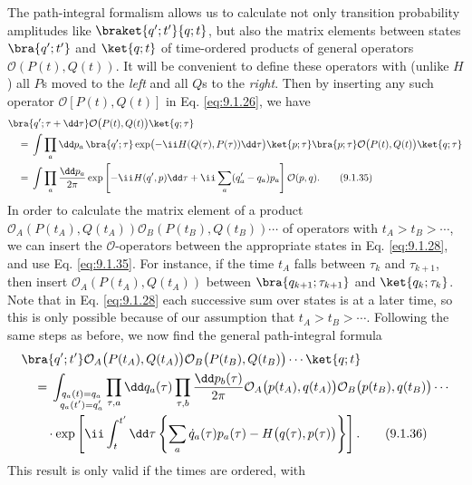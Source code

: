 The path-integral formalism allows us to calculate not only transition
probability amplitudes like $\braket{q';t'}{q;t}$, but also the matrix
elements between states $\bra{q';t'}$ and $\ket{q;t}$ of time-ordered
products of general operators $\mathcal{O}(P(t),Q(t))$. It will be convenient
to define these operators with (unlike $H$) all $P$s moved to the \emph{left}
and all $Q$s to the \emph{right}. Then by inserting any such operator
$\mathcal{O}[P(t),Q(t)]$ in Eq. \eqref{eq:9.1.26}, we have
\begin{align}
  &\bra{q';\tau+\dd\tau}\mathcal{O}\bigl(P(t),Q(t)\bigr)\ket{q;\tau}
  \notag\\
  &\quad={}
  \int\prod_a \dd p_a\,
  \bra{q';\tau}\exp\bigl(-\ii H(Q(\tau),P(\tau))\dd\tau\bigr)\ket{p;\tau}
  \bra{p;\tau}\mathcal{O}\bigl(P(t),Q(t)\bigr)\ket{q;\tau}
  \notag\\
  &\quad={}
  \int\prod_a\frac{\dd p_a}{2\pi}
  \exp\left[-\ii H(q',p)\dd\tau+\ii\sum_a(q'_a-q_a)p_a\right]
  \mathcal{O}(p,q).
  \tag{9.1.35}\label{eq:9.1.35}
\end{align}
In order to calculate the matrix element of a product
$\mathcal{O}_A(P(t_A),Q(t_A))\mathcal{O}_B(P(t_B),Q(t_B))\cdots$ of
operators with $t_A>t_B>\cdots$, we can insert the $\mathcal{O}$-operators
between the appropriate states in Eq. \eqref{eq:9.1.28}, and use Eq. \eqref{eq:9.1.35}. For
instance, if the time $t_A$ falls between $\tau_k$ and $\tau_{k+1}$, then
insert $\mathcal{O}_A(P(t_A),Q(t_A))$ between $\bra{q_{k+1};\tau_{k+1}}$
and $\ket{q_k;\tau_k}$. Note that in Eq. \eqref{eq:9.1.28} each successive sum over
states is at a later time, so this is only possible because of our assumption
that $t_A>t_B>\cdots$. Following the same steps as before, we now find the
general path-integral formula
\begin{align}
  &\bra{q';t'}\mathcal{O}_A\bigl(P(t_A),Q(t_A)\bigr)
  \mathcal{O}_B\bigl(P(t_B),Q(t_B)\bigr)\cdots\ket{q;t}
  \notag\\
  &\quad={}
  \int_{\substack{q_a(t)=q_a\\q_a(t')=q'_a}}
  \prod_{\tau,a}\dd q_a(\tau)\prod_{\tau,b}\frac{\dd p_b(\tau)}{2\pi}
  \mathcal{O}_A\bigl(p(t_A),q(t_A)\bigr)
  \mathcal{O}_B\bigl(p(t_B),q(t_B)\bigr)\cdots
  \notag\\
  &\qquad\cdot\exp\left[\ii\int_t^{t'}\dd\tau
  \left\{\sum_a\dot q_a(\tau)p_a(\tau)
  -H\bigl(q(\tau),p(\tau)\bigr)\right\}\right].
  \tag{9.1.36}\label{eq:9.1.36}
\end{align}
This result is only valid if the times are ordered, with
